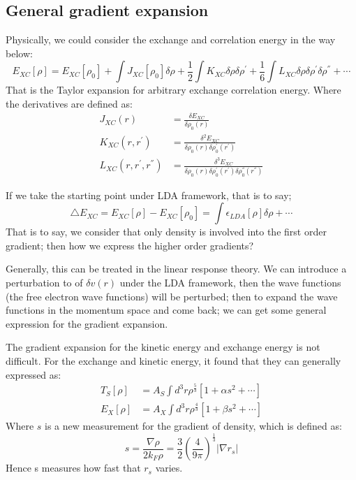 \subsection{General gradient expansion}
\label{sec:Taylor_expansion_in_function}
%
%
%
%
Physically, we could consider the exchange and correlation energy in
the way below: 
\begin{equation}
  \label{eq:FIDFTeq:90}
  E_{XC}[\rho] = E_{XC}[\rho_{0}] + \int J_{XC}[\rho_{0}]\delta\rho +
  \frac{1}{2}\int K_{XC}\delta\rho\delta\rho^{'} + \frac{1}{6}\int
L_{XC}\delta\rho\delta\rho^{'}\delta\rho^{''} + \cdots  
\end{equation}
That is the Taylor expansion for arbitrary exchange correlation
energy.  Where the derivatives are defined as:
\begin{equation}
  \label{eq:FIDFTeq:91}
  \begin{split}
    J_{XC}(r) &= \frac{\delta E_{XC}}{\delta\rho_{0}(r)} \\
    K_{XC} (r, r^{'}) &= \frac{\delta^{2}
      E_{XC}}{\delta\rho_{0}(r)\delta\rho^{'}_{0}(r^{'})} \\
    L_{XC} (r, r^{'}, r^{''}) &= \frac{\delta^{3}
      E_{XC}}{\delta\rho_{0}(r)\delta\rho^{'}_{0}(r^{'})
\delta\rho^{''}_{0}(r^{''})}
  \end{split}
\end{equation}

If we take the starting point under LDA framework, that is to say;
\begin{equation}
  \label{eq:FIDFTeq:120}
  \triangle E_{XC} = E_{XC}[\rho] - E_{XC}[\rho_{0}] = \int
  \epsilon_{LDA}[\rho]\delta\rho + \cdots
\end{equation}
That is to say, we consider that only density is involved into the
first order gradient; then how we express the higher order gradients? 

Generally, this can be treated in the linear response theory. We can introduce
a perturbation to of $\delta v(r)$ under the LDA framework, then the wave
functions (the free electron wave functions) will be perturbed; then to expand
the wave functions in the momentum space and come back; we can get some
general expression for the gradient expansion.

The gradient expansion for the kinetic energy and exchange energy is not
difficult\cite{PhysRevB.54.17402}.  For the exchange and
kinetic energy, it found that they can generally expressed as:
\begin{equation}
 \begin{split}
  T_{S}[\rho] &= A_{S} \int d^{3}r \rho^{\frac{5}{3}}[1+\alpha s^{2} + 
\cdots] \\
  E_{X}[\rho] &= A_{X} \int d^{3}r \rho^{\frac{4}{3}}[1+\beta s^{2} + 
\cdots] 
 \end{split}
\label{eq:FIDFTeq:121}
\end{equation}
Where $s$ is a new measurement for the gradient of density, which is defined as:
\begin{equation}
 s = \frac{\nabla\rho}{2k_{F}\rho} = \frac{3}{2}\left(
\frac{4}{9\pi}\right) ^{\frac{1}{3}}
|\nabla r_{s}|
\label{eq:FIDFTeq:122}
\end{equation}
Hence s measures how fast that $r_{s}$ varies\cite{DFT_PAPERS_GATHERING}.

